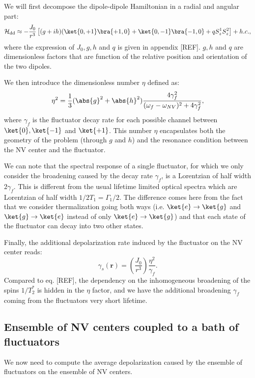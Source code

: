 \documentclass[a4paper,11pt]{report}
\begin{document}
We will first decompose the dipole-dipole Hamiltonian in a radial and angular part:
\begin{equation}
\mathcal{H}_{\rm dd} \approx - \frac{J_0}{r^3} \left[(g+ih)(\ket{0,+1}\bra{+1,0}+\ket{0,-1}\bra{-1,0}+qS_z^1 S_z^2 \right] + h.c. ,
\end{equation}
where the expression of $J_0, g, h$ and $q$ is given in appendix [REF]. $g, h$ and $q$ are dimensionless factors that are function of the relative position and orientation of the two dipoles.

We then introduce the dimensionless number $\eta$ defined as:
\begin{equation}
\label{eq eta}
\eta^2=\frac{1}{3} (\abs{g}^2+\abs{h}^2)  \frac{4\gamma_f^2}{(\omega_f - \omega_{NV})^2+4\gamma_f^2},
\end{equation}
where $\gamma_f$ is the fluctuator decay rate for each possible channel between $\ket{0}, \ket{-1}$ and $\ket{+1}$. This number $\eta$ encapsulates both the geometry of the problem (through $g$ and $h$) and the resonance condition between the NV center and the fluctuator.

We can note that the spectral response of a single fluctuator, for which we only consider the broadening caused by the decay rate $\gamma_f$, is a Lorentzian of half width $2\gamma_f$. This is different from the usual lifetime limited optical spectra which are Lorentzian of half width $1/2T_1=\Gamma_1/2$. The difference comes here from the fact that we consider thermalization going both ways (i.e. $\ket{e} \to \ket{g}$ and $\ket{g} \to \ket{e}$ instead of only $\ket{e} \to \ket{g}$) and that each state of the fluctuator can decay into two other states.

Finally, the additional depolarization rate induced by the fluctuator on the NV center reads:
\begin{equation}
\gamma_s(\mathbf{r})=\left(\frac{J_0}{r^3}\right) \frac{\eta^2}{\gamma_f}.
\end{equation}
Compared to eq. [REF], the dependency on the inhomogeneous broadening of the spins $1/T_2^*$ is hidden in the $\eta$ factor, and we have the additional broadening $\gamma_f$ coming from the fluctuators very short lifetime.

\subsection{Ensemble of NV centers coupled to a bath of fluctuators}

We now need to compute the average depolarization caused by the ensemble of fluctuators on the ensemble of NV centers.
\end{document}
